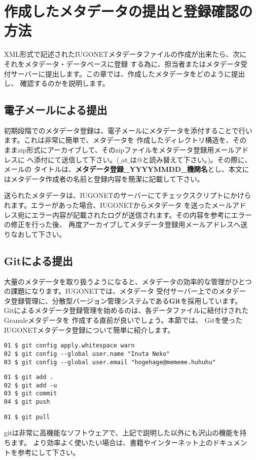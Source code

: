 \chapter{作成したメタデータの提出と登録確認の方法}
 XML形式で記述されたIUGONETメタデータファイルの作成が出来たら、次にそれをメタデータ・データベースに登録
する為に、担当者またはメタデータ受付サーバーに提出します。この章では、作成したメタデータをどのように提出し、
確認するのかを説明します。

\section{電子メールによる提出}
 初期段階でのメタデータ登録は、電子メールにメタデータを添付することで行います。これは非常に簡単で、メタデータを
作成したディレクトリ構造を、そのままzip形式にアーカイブして、そのzipファイルをメタデータ登録用メールアドレスに
へ添付にて送信して下さい。($\_$at$\_$は@と読み替えて下さい。)。その際に、メールの
タイトルは、{\bf メタデータ登録\_YYYYMMDD\_機関名}とし、本文にはメタデータ作成者の名前と登録内容を簡潔に記載して下さい。
\par
 送られたメタデータは、IUGONETのサーバーにてチェックスクリプトにかけられます。エラーがあった場合、IUGONETからメタデータ
を送ったメールアドレス宛にエラー内容が記載されたログが送信されます。その内容を参考にエラーの修正を行った後、
再度アーカイブしてメタデータ登録用メールアドレスへ送りなおして下さい。

\section{Gitによる提出}
大量のメタデータを取り扱うようになると、メタデータの効率的な管理がひとつの課題になります。IUGONETでは、メタデータ
受付サーバー上でのメタデータ登録管理に、分散型バージョン管理システムである{\bf Git}を採用しています。
Gitによるメタデータ登録管理を始めるのは、各データファイルに紐付けされたGranuleメタデータを
作成する直前が良いでしょう。本節では、
Gitを使ったIUGONETメタデータ登録について簡単に紹介します。\par
 
\begin{screen}
\begin{verbatim}
01 $ git config apply.whitespace warn
02 $ git config --global user.name "Inuta Neko"
03 $ git config --global user.email "hogehage@mememe.huhuhu"
\end{verbatim}
\end{screen}

\begin{screen}
\begin{verbatim}
01 $ git add .
02 $ git add -u
03 $ git commit
04 $ git push
\end{verbatim}
\end{screen}

\begin{screen}
\begin{verbatim}
01 $ git pull
\end{verbatim}
\end{screen}

gitは非常に高機能なソフトウェアで、上記で説明した以外にも沢山の機能を持ちます。
より効率よく使いたい場合は、書籍やインターネット上のドキュメントを参考にして下さい。
